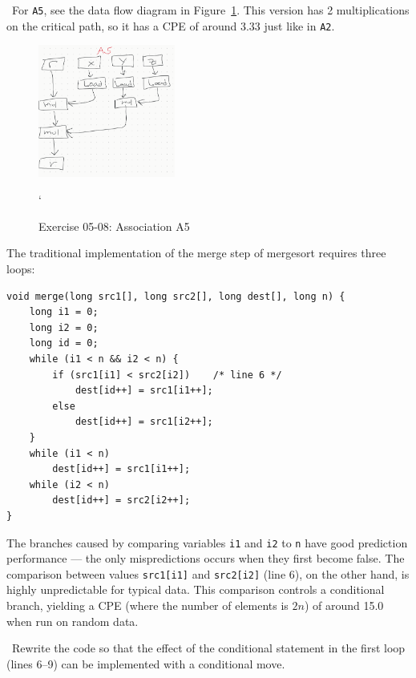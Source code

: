 \documentclass[12pt]{article}
\newenvironment{ex}[2][Exercise]{\begin{trivlist}
		\item[\hskip \labelsep {\bfseries #1}\hskip \labelsep {\bfseries #2.}]}{\end{trivlist}}
\newenvironment{sol}[1][Solution]{\begin{trivlist}
		\item[\hskip \labelsep {\bfseries #1:}]}{\end{trivlist}}
\begin{document}
\begin{sol}
	\
	For \texttt{A5}, see the data flow diagram in Figure~\ref{fig:ex-05-08-a5}. This
	version has 2 multiplications on the critical path, so it has a CPE of around $3.33$
	just like in \texttt{A2}.
	\begin{figure}
		\centering
		\includegraphics[width=0.4\textwidth]{exercise-05-08-a5.png}
		\caption{Exercise 05-08: Association A5}`
		\label{fig:ex-05-08-a5}
	\end{figure}
\end{sol}
\begin{ex}{5.9}
	The traditional implementation of the merge step of mergesort requires three loops:
	\begin{lstlisting}
void merge(long src1[], long src2[], long dest[], long n) {
	long i1 = 0;
	long i2 = 0;
	long id = 0;
	while (i1 < n && i2 < n) {
		if (src1[i1] < src2[i2])	/* line 6 */
			dest[id++] = src1[i1++];
		else
			dest[id++] = src1[i2++];
	}
	while (i1 < n)
		dest[id++] = src1[i1++];
	while (i2 < n)
		dest[id++] = src2[i2++];
}
	\end{lstlisting}
	The branches caused by comparing variables \texttt{i1} and \texttt{i2} to \texttt{n} have
	good prediction performance --- the only mispredictions occurs when they first become false.
	The comparison between values \texttt{src1[i1]} and \texttt{src2[i2]} (line 6), on the other
	hand, is highly unpredictable for typical data. This comparison controls a conditional
	branch, yielding a CPE (where the number of elements is $2n$) of around 15.0 when run on
	random data.
	
	\
	Rewrite the code so that the effect of the conditional statement in the first loop (lines 6--9)
	can be implemented with a conditional move.
\end{ex}
\end{document}
